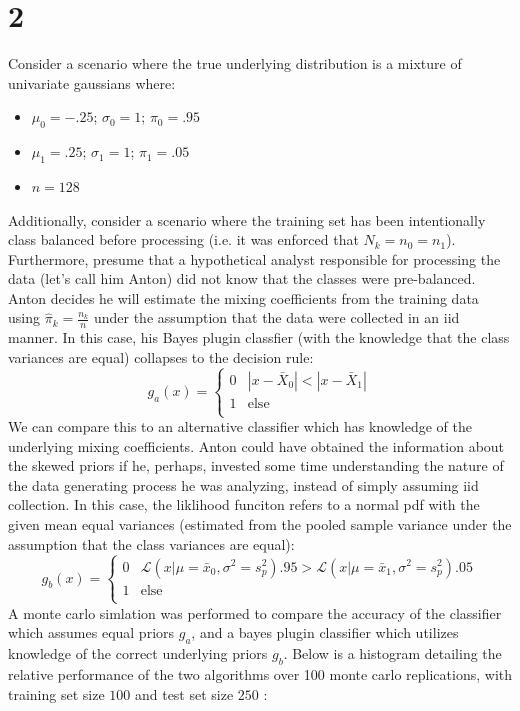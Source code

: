 \documentclass{article}
\begin{document}
    \section*{2}
      Consider a scenario where the true underlying distribution is a mixture of univariate gaussians where:
      \begin{itemize}
        \item $\mu_0 = -.25$; $\sigma_0 = 1$; $\pi_0 = .95$
        \item $\mu_1 = .25$; $\sigma_1 = 1$; $\pi_1 = .05$
        \item $n=128$
      \end{itemize}
      Additionally, consider a scenario where the training set has been intentionally class balanced before processing (i.e. it was enforced that $N_k = n_0 = n_1$). Furthermore, presume that a hypothetical analyst responsible for processing the data (let's call him Anton) did not know that the classes were pre-balanced. Anton decides he will estimate the mixing coefficients from the training data using $\hat \pi_k = \frac{n_k}{n}$ under the assumption that the data were collected in an iid manner. In this case, his Bayes plugin classfier (with the knowledge that the class variances are equal) collapses to the decision rule:
      \[g_a(x) =
        \begin{cases}
          0 & |x - \bar X_0| < |x - \bar X_1|\\
          1 & \text{else}\\
        \end{cases}
      \]
      We can compare this to an alternative classifier which has knowledge of the underlying mixing coefficients. Anton could have obtained the information about the skewed priors if he, perhaps, invested some time understanding the nature of the data generating process he was analyzing, instead of simply assuming iid collection. In this case, the liklihood funciton refers to a normal pdf with the given mean equal variances (estimated from the pooled sample variance under the assumption that the class variances are equal):
      \[g_b(x) =
        \begin{cases}
          0 & \mathcal L(x | \mu = \bar x_0, \sigma^2 = s_p^2).95 > \mathcal L(x | \mu = \bar x_1, \sigma^2=s_p^2).05\\
          1 & \text{else}\\
        \end{cases}
      \]
      A monte carlo simlation was performed to compare the accuracy of the classifier which assumes equal priors $g_a$, and a bayes plugin classifier which utilizes knowledge of the correct underlying priors $g_b$. Below is a histogram detailing the relative performance of the two algorithms over 100 monte carlo replications, with training set size $100$ and test set size $250$ :\\[6pt]
\end{document}
